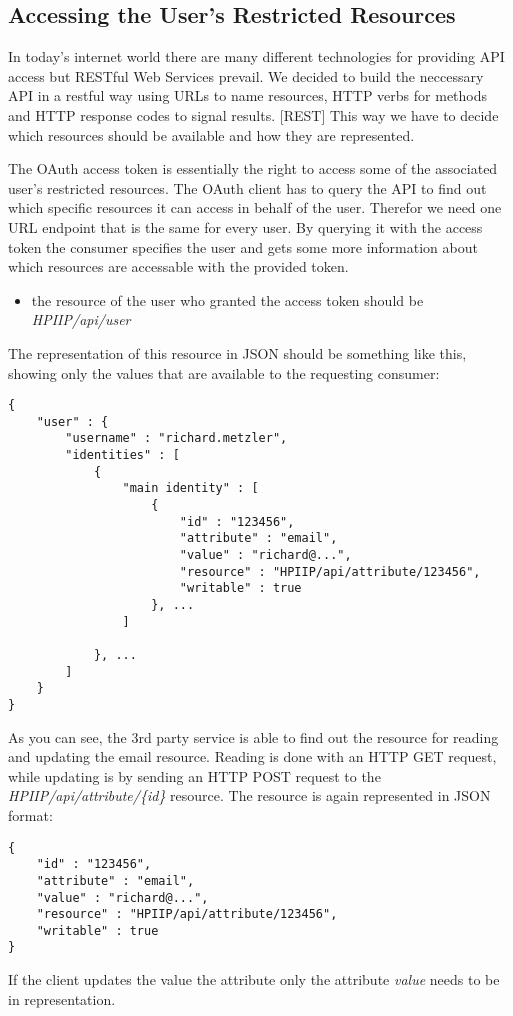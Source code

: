 \subsection{Accessing the User's Restricted Resources}

In today's internet world there are many different technologies for
providing API access but RESTful Web Services prevail. We decided
to build the neccessary API in a restful way using URLs to name
resources, HTTP verbs for methods and HTTP response codes to signal
results. [REST] This way we have to decide which resources should
be available and how they are represented.

The OAuth access token is essentially the right to access some of
the associated user's restricted resources. The OAuth client has to
query the API to find out which specific resources it can access in
behalf of the user. Therefor we need one URL endpoint that is the
same for every user. By querying it with the access token the
consumer specifies the user and gets some more information about
which resources are accessable with the provided token.

\begin{itemize}
\item
  the resource of the user who granted the access token should be
  \emph{HPIIP/api/user}
\end{itemize}
The representation of this resource in JSON should be something
like this, showing only the values that are available to the
requesting consumer:

\begin{verbatim}
{
    "user" : {
        "username" : "richard.metzler",
        "identities" : [
            {
                "main identity" : [
                    {
                        "id" : "123456",
                        "attribute" : "email",
                        "value" : "richard@...",
                        "resource" : "HPIIP/api/attribute/123456",
                        "writable" : true
                    }, ...
                ]

            }, ...
        ]
    }
}
\end{verbatim}
As you can see, the 3rd party service is able to find out the
resource for reading and updating the email resource. Reading is
done with an HTTP GET request, while updating is by sending an HTTP
POST request to the \emph{HPIIP/api/attribute/\{id\}} resource. The
resource is again represented in JSON format:

\begin{verbatim}
{
    "id" : "123456",
    "attribute" : "email",
    "value" : "richard@...",
    "resource" : "HPIIP/api/attribute/123456",
    "writable" : true
}
\end{verbatim}
If the client updates the value the attribute only the attribute
\emph{value} needs to be in representation.

